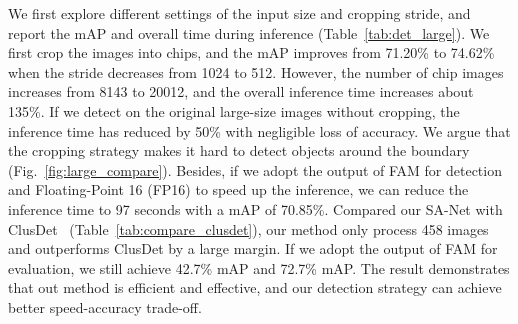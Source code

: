 \documentclass[10pt,journal,final]{IEEEtran}
\begin{document}
We first explore different settings of the input size and cropping stride, and report the mAP and overall time during inference (Table~\ref{tab:det_large}). We first crop the images into  chips, and the mAP improves from 71.20\% to 74.62\% when the stride decreases from 1024 to 512. However, the number of chip images increases from 8143 to 20012, and the overall inference time increases about 135\%. If we detect on the original large-size images without cropping, the inference time has reduced by 50\% with negligible loss of accuracy. We argue that the cropping strategy makes it hard to detect objects around the boundary (Fig.~\ref{fig:large_compare}). Besides, if we adopt the output of FAM for detection and Floating-Point 16 (FP16) to speed up the inference, we can reduce the inference time to 97 seconds with a mAP of 70.85\%. 
Compared our SA-Net with ClusDet~\cite{Yang2019clusdet} (Table~\ref{tab:compare_clusdet}), our method only process 458 images and outperforms ClusDet by a large margin. If we adopt the output of FAM for evaluation, we still achieve 42.7\% mAP and 72.7\% mAP. The result demonstrates that out method is efficient and effective, and our detection strategy can achieve better speed-accuracy trade-off.
\end{document}
